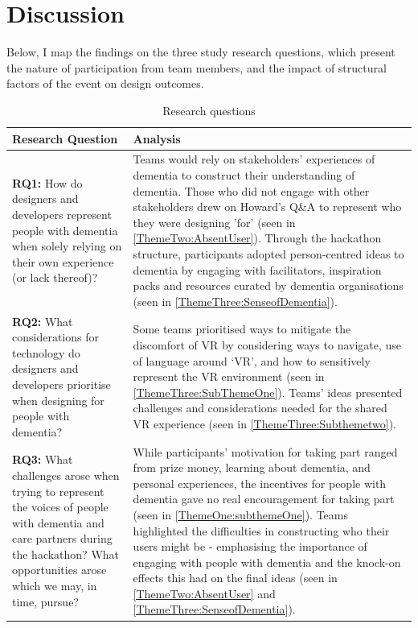 \section{Discussion}
\label{sec:Discussion}
Below, I map the findings on the three study research questions, which present the nature of participation from team members, and the impact of structural factors of the event on design outcomes.

\begin{table}[htp]
 \caption{Research questions}
  \label{table:RQ-vs-Analysis}
\begin{tabular}{  m{12em} | m{10cm} } 

 \textbf{Research Question} & \textbf{Analysis} \\ \hline
 \textbf{RQ1:} How do designers and developers represent people with dementia when solely relying on their own experience (or lack thereof)? & Teams would rely on stakeholders' experiences of dementia to construct their understanding of dementia. Those who did not engage with other stakeholders drew on Howard's Q\&A to represent who they were designing 'for' (seen in \ref{ThemeTwo:AbsentUser}). \newline \newline Through the hackathon structure, participants adopted person-centred ideas to dementia by engaging with facilitators, inspiration packs and resources curated by dementia organisations (seen in \ref{ThemeThree:SenseofDementia}). 
 \\ 
  \hline
  \textbf{RQ2:} What considerations for technology do designers and developers prioritise when designing for people with dementia? & Some teams prioritised ways to mitigate the discomfort of VR by considering ways to navigate, use of language around `VR', and how to sensitively represent the VR environment (seen in \ref{ThemeThree:SubThemeOne}). \newline \newline Teams' ideas presented challenges and considerations needed for the shared VR experience (seen in \ref{ThemeThree:Subthemetwo}).\\ 
  \hline
  \textbf{RQ3:} What challenges arose when trying to represent the voices of people with dementia and care partners during the hackathon? What opportunities arose which we may, in time, pursue? & While participants' motivation for taking part ranged from prize money, learning about dementia, and personal experiences, the incentives for people with dementia gave no real encouragement for taking part (seen in \ref{ThemeOne:subthemeOne}). \newline \newline Teams highlighted the difficulties in constructing who their users might be - emphasising the importance of engaging with people with dementia and the knock-on effects this had on the final ideas (seen in \ref{ThemeTwo:AbsentUser} and \ref{ThemeThree:SenseofDementia}).  \\
  \hline
\end{tabular}
\end{table}


